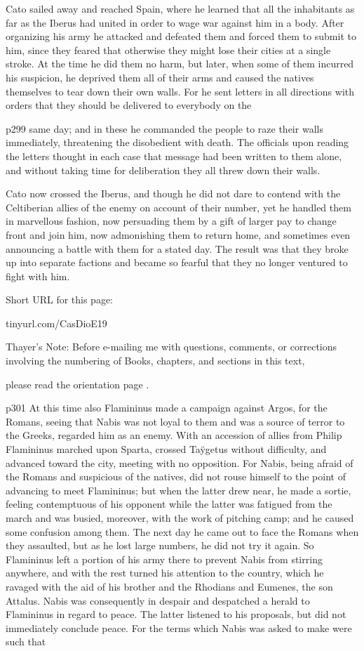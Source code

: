 Cato sailed away and reached Spain, where he learned that all the inhabitants as far as the Iberus had united in order to wage war against him in a body. After organizing his army he attacked and defeated them and forced them to submit to him, since they feared that otherwise they might lose their cities at a single stroke. At the time he did them no harm, but later, when some of them incurred his suspicion, he deprived them all of their arms and caused the natives themselves to tear down their own walls. For he sent letters in all directions with orders that they should be delivered to everybody on the

p299 same day; and in these he commanded the people to raze their walls immediately, threatening the disobedient with death. The officials upon reading the letters thought in each case that message had been written to them alone, and without taking time for deliberation they all threw down their walls.

Cato now crossed the Iberus, and though he did not dare to contend with the Celtiberian allies of the enemy on account of their number, yet he handled them in marvellous fashion, now persuading them by a gift of larger pay to change front and join him, now admonishing them to return home, and sometimes even announcing a battle with them for a stated day. The result was that they broke up into separate factions and became so fearful that they no longer ventured to fight with him.


Short URL for this page:

tinyurl.com/CasDioE19

Thayer's Note: Before e-mailing me with questions, comments, or corrections involving the numbering of Books, chapters, and sections in this text,

please read the orientation page .

p301
At this time also Flamininus made a campaign against Argos, for the Romans, seeing that Nabis was not loyal to them and was a source of terror to the Greeks, regarded him as an enemy. With an accession of allies from Philip Flamininus marched upon Sparta, crossed Taÿgetus without difficulty, and advanced toward the city, meeting with no opposition. For Nabis, being afraid of the Romans and suspicious of the natives, did not rouse himself to the point of advancing to meet Flamininus; but when the latter drew near, he made a sortie, feeling contemptuous of his opponent while the latter was fatigued from the march and was busied, moreover, with the work of pitching camp; and he caused some confusion among them. The next day he came out to face the Romans when they assaulted, but as he lost large numbers, he did not try it again. So Flamininus left a portion of his army there to prevent Nabis from stirring anywhere, and with the rest turned his attention to the country, which he ravaged with the aid of his brother and the Rhodians and Eumenes, the son Attalus. Nabis was consequently in despair and despatched a herald to Flamininus in regard to peace. The latter listened to his proposals, but did not immediately conclude peace. For the terms which Nabis was asked to make were such that

